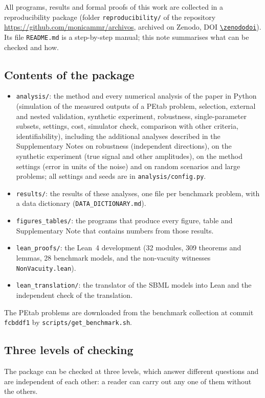 
All programs, results and formal proofs of this work are collected in a reproducibility package (folder \texttt{reproducibility/} of the repository \url{https://github.com/monicammr/archivos}, archived on Zenodo, DOI \href{https://doi.org/\zenododoi}{\nolinkurl{\zenododoi}}). Its file \texttt{README.md} is a step-by-step manual; this note summarises what can be checked and how.

\subsection*{Contents of the package}
\begin{itemize}\itemsep0pt
\item \texttt{analysis/}: the method and every numerical analysis of the paper in Python (simulation of the measured outputs of a PEtab problem, selection, external and nested validation, synthetic experiment, robustness, single-parameter subsets, settings, cost, simulator check, comparison with other criteria, identifiability), including the additional analyses described in the Supplementary Notes on robustness (independent directions), on the synthetic experiment (true signal and other amplitudes), on the method settings (error in units of the noise) and on random scenarios and large problems; all settings and seeds are in \texttt{analysis/config.py}.
\item \texttt{results/}: the results of these analyses, one file per benchmark problem, with a data dictionary (\texttt{DATA\_DICTIONARY.md}).
\item \texttt{figures\_tables/}: the programs that produce every figure, table and Supplementary Note that contains numbers from those results.
\item \texttt{lean\_proofs/}: the Lean~4 development (32 modules, 309 theorems and lemmas, 28 benchmark models, and the non-vacuity witnesses \texttt{NonVacuity.lean}).
\item \texttt{lean\_translation/}: the translator of the SBML models into Lean and the independent check of the translation.
\end{itemize}
The PEtab problems are downloaded from the benchmark collection at commit \texttt{fcbddf1} by \texttt{scripts/get\_benchmark.sh}.

\subsection*{Three levels of checking}
The package can be checked at three levels, which answer different questions and are independent of each other: a reader can carry out any one of them without the others.


